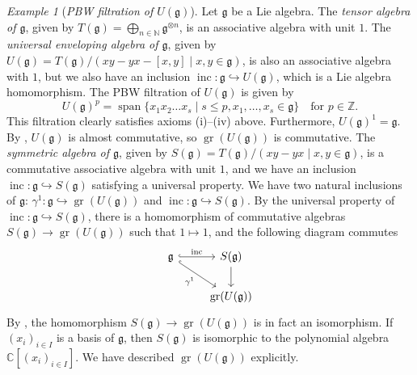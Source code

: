 \documentclass[a4paper, 12pt, reqno]{amsart}
\theoremstyle{remark}
\newtheorem{example}[theorem]{Example}
\DeclareMathOperator{\gr}{gr}
\DeclareMathOperator{\vspan}{span}
\DeclareMathOperator{\inc}{inc}
\begin{document}
\begin{example}[\emph{PBW filtration of $U(\mathfrak{g})$}]
  \label{exa:23}
  Let $\mathfrak{g}$ be a Lie algebra.
  The \emph{tensor algebra of $\mathfrak{g}$}, given by $T(\mathfrak{g}) = \bigoplus_{n \in \mathbb{N}}\mathfrak{g}^{\otimes n}$, is an associative algebra with unit $1$.
  The \emph{universal enveloping algebra of $\mathfrak{g}$}, given by $U(\mathfrak{g}) = T(\mathfrak{g})/(xy - yx - [x, y] \mid x, y \in \mathfrak{g})$, is also an associative algebra with $1$, but we also have an inclusion $\inc: \mathfrak{g} \hookrightarrow U(\mathfrak{g})$, which is a Lie algebra homomorphism.
  The PBW filtration of $U(\mathfrak{g})$ is given by
  \begin{equation*}
    U(\mathfrak{g})^p = \vspan\{x_1x_2\dots x_s \mid s \le p, x_1, \dots, x_s \in \mathfrak{g}\} \quad \text{for $p \in \mathbb{Z}$}.
  \end{equation*}
  This filtration clearly satisfies axioms (i)--(iv) above.
  Furthermore, $U(\mathfrak{g})^1 = \mathfrak{g}$.
  By \cite[Lemma 2.1.5]{dixmier_enveloping_1996}, $U(\mathfrak{g})$ is almost commutative, so $\gr(U(\mathfrak{g}))$ is commutative.
  The \emph{symmetric algebra of $\mathfrak{g}$}, given by $S(\mathfrak{g}) = T(\mathfrak{g})/(xy - yx \mid x, y \in \mathfrak{g})$, is a commutative associative algebra with unit $1$, and we have an inclusion $\inc: \mathfrak{g} \hookrightarrow S(\mathfrak{g})$ satisfying a universal property.
  We have two natural inclusions of $\mathfrak{g}$: $\gamma^1: \mathfrak{g} \hookrightarrow \gr(U(\mathfrak{g}))$ and $\inc: \mathfrak{g} \hookrightarrow S(\mathfrak{g})$.
  By the universal property of $\inc: \mathfrak{g} \hookrightarrow S(\mathfrak{g})$, there is a homomorphism of commutative algebras $S(\mathfrak{g}) \to \gr(U(\mathfrak{g}))$ such that $1 \mapsto 1$, and the following diagram commutes
  \begin{equation*}
    \begin{tikzcd}
      \mathfrak{g} \arrow[r, "\inc", hook] \arrow[rd, "\gamma^1"', hook] & S(\mathfrak{g}) \arrow[d] \\
      & \gr(U(\mathfrak{g}))
    \end{tikzcd}
  \end{equation*}
  By \cite[Proposition 2.3.6]{dixmier_enveloping_1996}, the homomorphism $S(\mathfrak{g}) \to \gr(U(\mathfrak{g}))$ is in fact an isomorphism.
  If $(x_i)_{i \in I}$ is a basis of $\mathfrak{g}$, then $S(\mathfrak{g})$ is isomorphic to the polynomial algebra $\mathbb{C}[(x_i)_{i \in I}]$.
  We have described $\gr(U(\mathfrak{g}))$ explicitly.
\end{example}
\end{document}
